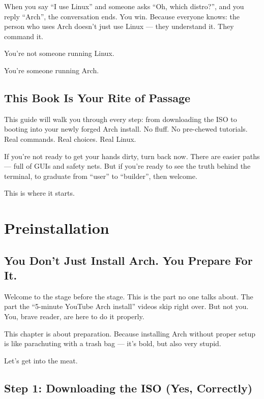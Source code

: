 \documentclass[12pt,openany]{book}
\begin{document}
When you say “I use Linux” and someone asks “Oh, which distro?”, and you reply “Arch”, the conversation ends. You win. Because everyone knows: the person who uses Arch doesn’t just use Linux — they understand it. They command it.

You’re not someone running Linux.

You’re someone running Arch.

\section*{This Book Is Your Rite of Passage}

This guide will walk you through every step: from downloading the ISO to booting into your newly forged Arch install. No fluff. No pre-chewed tutorials. Real commands. Real choices. Real Linux.

If you're not ready to get your hands dirty, turn back now. There are easier paths — full of GUIs and safety nets. But if you're ready to see the truth behind the terminal, to graduate from “user” to “builder”, then welcome.

This is where it starts.

\clearpage


\chapter{Preinstallation}

\section*{You Don't Just Install Arch. You Prepare For It.}

Welcome to the stage before the stage. This is the part no one talks about. The part the “5-minute YouTube Arch install” videos skip right over. But not you. You, brave reader, are here to do it properly.

This chapter is about preparation. Because installing Arch without proper setup is like parachuting with a trash bag — it's bold, but also very stupid.

Let’s get into the meat.

\section*{Step 1: Downloading the ISO (Yes, Correctly)}
\end{document}
